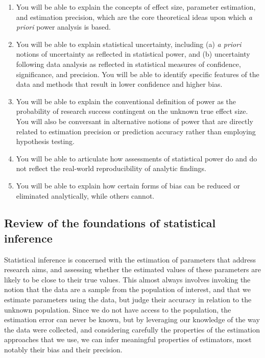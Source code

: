 \begin{enumerate}

\item You will be able to explain the concepts of effect size, parameter estimation, and estimation precision, which are the core theoretical ideas upon which {\em a priori} power analysis is based.

\item You will be able to explain statistical uncertainty, including (a) {\em a priori} notions of uncertainty as reflected in statistical power, and (b) uncertainty following data analysis as reflected in statistical measures of confidence, significance, and precision.  You will be able to identify specific features of the data and methods that result in lower confidence and higher bias.

\item You will be able to explain the conventional definition of power as the probability of research success contingent on the unknown true effect size. You will also be conversant in alternative notions of power that are directly related to estimation precision or prediction accuracy rather than employing hypothesis testing.

\item You will be able to articulate how assessments of statistical power do and do not reflect the real-world reproducibility of analytic findings.

\item You will be able to explain how certain forms of bias can be reduced or eliminated analytically, while others cannot.

\end{enumerate}


\subsection{Review of the foundations of statistical inference}

Statistical inference is concerned with the estimation of parameters that address research aims, and assessing whether the estimated values of these parameters are likely to be close to their true values.  This almost always involves invoking the notion that the data are a sample from the population of interest, and that we estimate parameters using the data, but judge their accuracy in relation to the unknown population.  Since we do not have access to the population, the estimation error can never be known, but by leveraging our knowledge of the way the data were collected, and considering carefully the properties of the estimation approaches that we use, we can infer meaningful properties of estimators, most notably their bias and their precision.

